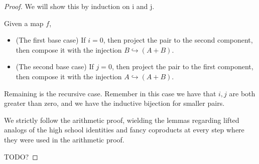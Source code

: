 \documentclass{proc-l}
\theoremstyle{definition}
\theoremstyle{remark}
\numberwithin{equation}{section}
\begin{document}
\begin{proof}
We will show this by induction on i and j.

Given a map \(f\),

\begin{itemize}
\item (The first base case) If \(i = 0\), then project the pair to the second component, then compose it with the injection \(B \hookrightarrow (A + B)\).

\item (The second base case) If \(j = 0\), then project the pair to the first component, then compose it with the injection \(A \hookrightarrow (A + B)\).
\end{itemize}

Remaining is the recursive case. Remember in this case we have that \(i, j\) are both greater than zero, and we have the inductive bijection for smaller pairs.

We strictly follow the arithmetic proof, wielding the lemmas regarding lifted analogs of the high school identities and fancy coproducts at every step where they were used in the arithmetic
proof.

TODO?





\end{proof}
\end{document}
